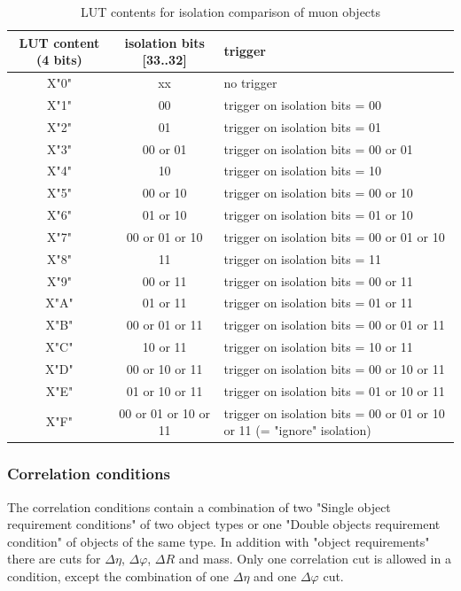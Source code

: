 \begin{table}[htdp]
\begin{center}
\begin{tabular}{|c|c|p{}|}\hline
LUT content (4 bits) & isolation bits [33..32] & trigger \\\hline\hline
X"0" & xx & no trigger\\\hline
X"1" & 00 & trigger on isolation bits = 00\\\hline
X"2" & 01 & trigger on isolation bits = 01\\\hline
X"3" & 00 or 01 & trigger on isolation bits = 00 or 01\\\hline
X"4" & 10 & trigger on isolation bits = 10\\\hline
X"5" & 00 or 10 & trigger on isolation bits = 00 or 10\\\hline
X"6" & 01 or 10 & trigger on isolation bits = 01 or 10\\\hline
X"7" & 00 or 01 or 10 & trigger on isolation bits = 00 or 01 or 10\\\hline
X"8" & 11 & trigger on isolation bits = 11\\\hline
X"9" & 00 or 11 & trigger on isolation bits = 00 or 11\\\hline
X"A" & 01 or 11 & trigger on isolation bits = 01 or 11\\\hline
X"B" & 00 or 01 or 11 & trigger on isolation bits = 00 or 01 or 11\\\hline
X"C" & 10 or 11 & trigger on isolation bits = 10 or 11\\\hline
X"D" & 00 or 10 or 11 & trigger on isolation bits = 00 or 10 or 11\\\hline
X"E" & 01 or 10 or 11 & trigger on isolation bits = 01 or 10 or 11\\\hline
X"F" & 00 or 01 or 10 or 11 & trigger on isolation bits = 00 or 01 or 10 or 11 (= "ignore" isolation)\\\hline
\end{tabular}
\end{center}
\caption{LUT contents for isolation comparison of muon objects}
\label{tab:gtl:muon_lut_iso}
\end{table}

\clearpage

\subsubsection{Correlation conditions}
\label{sec:gtl:correlation_conditions}
The correlation conditions contain a combination of two "Single object requirement conditions" of two object types or one "Double objects requirement condition" of objects of the same type.
In addition with "object requirements" there are cuts for $\Delta\eta$, $\Delta\varphi$, $\Delta$$R$ and mass.
Only one correlation cut is allowed in a condition, except the combination of one $\Delta\eta$ and one $\Delta\varphi$ cut.\\

